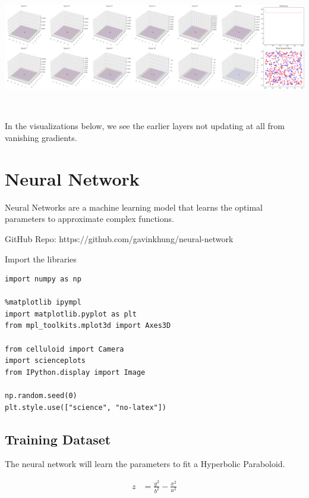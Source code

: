 \documentclass[openany]{book}
\begin{document}
    \begin{center}
    \includegraphics[width=\textwidth]{combined_files/combined_143_2.png}
    \end{center}
    { \hspace*{\fill} \\}
    
    In the visualizations below, we see the earlier layers not updating at
all from vanishing gradients.
        
    \section{Neural Network}\label{neural-network}

Neural Networks are a machine learning model that learns the optimal
parameters to approximate complex functions.

GitHub Repo: https://github.com/gavinkhung/neural-network

    Import the libraries

\begin{tcolorbox}
\tiny
\begin{verbatim}
import numpy as np

%matplotlib ipympl
import matplotlib.pyplot as plt
from mpl_toolkits.mplot3d import Axes3D

from celluloid import Camera
import scienceplots
from IPython.display import Image

np.random.seed(0)
plt.style.use(["science", "no-latex"])
\end{verbatim}
\end{tcolorbox}

    \subsection{Training Dataset}\label{training-dataset}

The neural network will learn the parameters to fit a Hyperbolic
Paraboloid.

\begin{align*}
z &= \frac{y^2}{b^2} - \frac{x^2}{a^2}
\end{align*}
\end{document}

